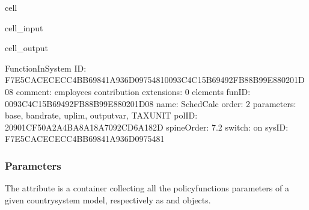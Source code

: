 \documentclass[letterpaper,10pt,english]{sphinxmanual}
\begin{document}
\begin{sphinxuseclass}{cell}
\begin{sphinxuseclass}{cell_input}
\begin{sphinxVerbatim}[commandchars=\\\{\}]
\PYG{p}{[}\PYG{p}{]}\PYG{p}{[}\PYG{p}{]}\PYG{p}{[}\PYG{p}{]}\PYG{p}{[}\PYG{p}{]}
\end{sphinxVerbatim}

\end{sphinxuseclass}
\begin{sphinxuseclass}{cell_output}
\begin{sphinxVerbatim}[commandchars=\\\{\}]
\PYGZhy{}\PYGZhy{}\PYGZhy{}\PYGZhy{}\PYGZhy{}\PYGZhy{}\PYGZhy{}\PYGZhy{}\PYGZhy{}\PYGZhy{}\PYGZhy{}\PYGZhy{}\PYGZhy{}\PYGZhy{}\PYGZhy{}\PYGZhy{}\PYGZhy{}\PYGZhy{}\PYGZhy{}\PYGZhy{}\PYGZhy{}\PYGZhy{}\PYGZhy{}\PYGZhy{}\PYGZhy{}\PYGZhy{}\PYGZhy{}\PYGZhy{}\PYGZhy{}\PYGZhy{}
FunctionInSystem
\PYGZhy{}\PYGZhy{}\PYGZhy{}\PYGZhy{}\PYGZhy{}\PYGZhy{}\PYGZhy{}\PYGZhy{}\PYGZhy{}\PYGZhy{}\PYGZhy{}\PYGZhy{}\PYGZhy{}\PYGZhy{}\PYGZhy{}\PYGZhy{}\PYGZhy{}\PYGZhy{}\PYGZhy{}\PYGZhy{}\PYGZhy{}\PYGZhy{}\PYGZhy{}\PYGZhy{}\PYGZhy{}\PYGZhy{}\PYGZhy{}\PYGZhy{}\PYGZhy{}\PYGZhy{}
	 ID: \PYGZsq{}F7E5CACE\PYGZhy{}CECC\PYGZhy{}4BB6\PYGZhy{}9841\PYGZhy{}A936D09754810093C4C1\PYGZhy{}5B69\PYGZhy{}492F\PYGZhy{}B88B\PYGZhy{}99E880201D08\PYGZsq{}
	 comment: \PYGZdq{}employee\PYGZsq{}s contribution\PYGZdq{}
	 extensions: 0 elements
	 funID: \PYGZsq{}0093C4C1\PYGZhy{}5B69\PYGZhy{}492F\PYGZhy{}B88B\PYGZhy{}99E880201D08\PYGZsq{}
	 name: \PYGZsq{}SchedCalc\PYGZsq{}
	 order: \PYGZsq{}2\PYGZsq{}
	 parameters: base, band\PYGZus{}rate, uplim, output\PYGZus{}var, TAX\PYGZus{}UNIT
	 polID: \PYGZsq{}20901CF5\PYGZhy{}0A2A\PYGZhy{}4BA8\PYGZhy{}A18A\PYGZhy{}7092CD6A182D\PYGZsq{}
	 spineOrder: \PYGZsq{}7.2\PYGZsq{}
	 switch: \PYGZsq{}on\PYGZsq{}
	 sysID: \PYGZsq{}F7E5CACE\PYGZhy{}CECC\PYGZhy{}4BB6\PYGZhy{}9841\PYGZhy{}A936D0975481\PYGZsq{}
\end{sphinxVerbatim}

\end{sphinxuseclass}
\end{sphinxuseclass}

\subsubsection{Parameters}
\label{\detokenize{getstarted:parameters}}
\sphinxAtStartPar
The attribute  is a container collecting all the policy\sphinxhyphen{}functions parameters of a given country\sphinxhyphen{}system model, respectively as  and  objects.
\end{document}
